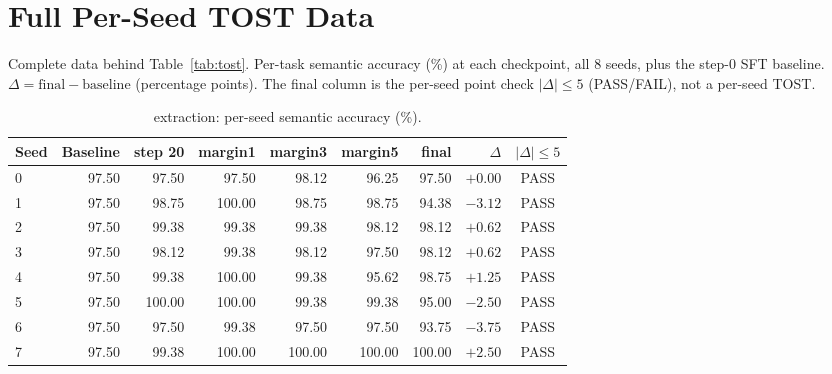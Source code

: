
\section{Full Per-Seed TOST Data}
\label{app:tost-data}
Complete data behind Table~\ref{tab:tost}. Per-task semantic accuracy (\%) at each checkpoint, all 8 seeds, plus the step-0 SFT baseline. $\Delta = \text{final} - \text{baseline}$ (percentage points). The final column is the per-seed point check $|\Delta| \le 5$ (PASS/FAIL), not a per-seed TOST.

\begin{table}[H]
\centering
\caption{extraction: per-seed semantic accuracy (\%).}
\small
\begin{tabular}{@{}lrrrrrrrc@{}}
\toprule
Seed & Baseline & step 20 & margin1 & margin3 & margin5 & final & $\Delta$ & $|\Delta| \le 5$\\
\midrule
0 & 97.50 & 97.50 & 97.50 & 98.12 & 96.25 & 97.50 & $+0.00$ & PASS\\
1 & 97.50 & 98.75 & 100.00 & 98.75 & 98.75 & 94.38 & $-3.12$ & PASS\\
2 & 97.50 & 99.38 & 99.38 & 99.38 & 98.12 & 98.12 & $+0.62$ & PASS\\
3 & 97.50 & 98.12 & 99.38 & 98.12 & 97.50 & 98.12 & $+0.62$ & PASS\\
4 & 97.50 & 99.38 & 100.00 & 99.38 & 95.62 & 98.75 & $+1.25$ & PASS\\
5 & 97.50 & 100.00 & 100.00 & 99.38 & 99.38 & 95.00 & $-2.50$ & PASS\\
6 & 97.50 & 97.50 & 99.38 & 97.50 & 97.50 & 93.75 & $-3.75$ & PASS\\
7 & 97.50 & 99.38 & 100.00 & 100.00 & 100.00 & 100.00 & $+2.50$ & PASS\\
\bottomrule
\end{tabular}
\end{table}

